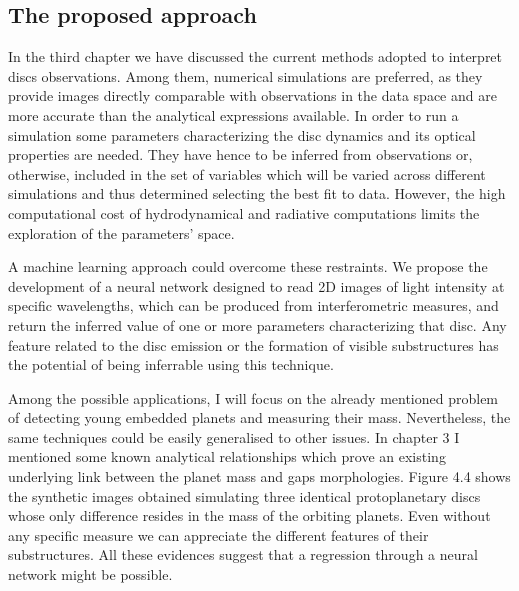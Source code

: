 \documentclass[a4paper,10pt]{report}
\begin{document}
\subsection{The proposed approach}

In the third chapter we have discussed the current methods adopted to interpret discs observations.
Among them, numerical simulations are preferred, as they provide images
directly comparable with observations in the data space and are more accurate than the analytical expressions available.
In order to run a simulation some parameters characterizing the disc dynamics and its optical properties are needed.
They have hence to be inferred from observations or, otherwise, included in the set of variables which will be varied across different simulations
and thus determined selecting the best fit to data. However, the high computational cost of hydrodynamical and radiative 
computations limits the exploration of the parameters' space.

A machine learning approach could overcome these restraints. We propose the development
of a neural network designed to read 2D images of light intensity at specific wavelengths,
which can be produced from interferometric measures, and return the inferred value of one or more 
parameters characterizing that disc. Any feature related to the disc emission or the formation of visible substructures 
has the potential of being inferrable using this technique.

Among the possible applications, I will focus on the already mentioned problem of detecting young embedded planets and measuring their mass.
Nevertheless, the same techniques could be easily generalised to other issues.
In chapter 3 I mentioned some known analytical relationships which prove an existing underlying link
between the planet mass and gaps morphologies. Figure 4.4 shows the synthetic images obtained simulating
three identical protoplanetary discs whose only difference resides in the mass of the orbiting planets. 
Even without any specific measure we can appreciate the different features of their substructures.
All these evidences suggest that a regression through a neural network might be possible.
\end{document}
